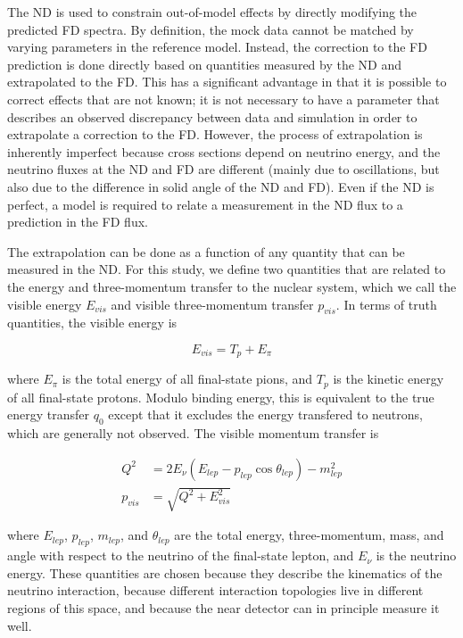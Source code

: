 \documentclass[11pt]{article}
\begin{document}
The ND is used to constrain out-of-model effects by directly modifying the predicted FD spectra. By definition, the mock data cannot be matched by varying parameters in the reference model. Instead, the correction to the FD prediction is done directly based on quantities measured by the ND and extrapolated to the FD. This has a significant advantage in that it is possible to correct effects that are not known; it is not necessary to have a parameter that describes an observed discrepancy between data and simulation in order to extrapolate a correction to the FD. However, the process of extrapolation is inherently imperfect because cross sections depend on neutrino energy, and the neutrino fluxes at the ND and FD are different (mainly due to oscillations, but also due to the difference in solid angle of the ND and FD). Even if the ND is perfect, a model is required to relate a measurement in the ND flux to a prediction in the FD flux. 

The extrapolation can be done as a function of any quantity that can be measured in the ND. For this study, we define two quantities that are related to the energy and three-momentum transfer to the nuclear system, which we call the visible energy $E_{vis}$ and visible three-momentum transfer $p_{vis}$. In terms of truth quantities, the visible energy is 

\begin{equation}
E_{vis} = T_{p} + E_{\pi}
\end{equation}

\noindent
where $E_{\pi}$ is the total energy of all final-state pions, and $T_{p}$ is the kinetic energy of all final-state protons. Modulo binding energy, this is equivalent to the true energy transfer $q_{0}$ except that it excludes the energy transfered to neutrons, which are generally not observed. The visible momentum transfer is

\begin{equation}
\begin{split}
Q^{2} & = 2 E_{\nu} (E_{lep} - p_{lep} \cos \theta_{lep}) - m_{lep}^{2} \\
p_{vis} & = \sqrt{Q^{2} + E_{vis}^{2}}
\end{split}
\end{equation}

\noindent
where $E_{lep}$, $p_{lep}$, $m_{lep}$, and $\theta_{lep}$ are the total energy, three-momentum, mass, and angle with respect to the neutrino of the final-state lepton, and $E_{\nu}$ is the neutrino energy. These quantities are chosen because they describe the kinematics of the neutrino interaction, because different interaction topologies live in different regions of this space, and because the near detector can in principle measure it well.
\end{document}
